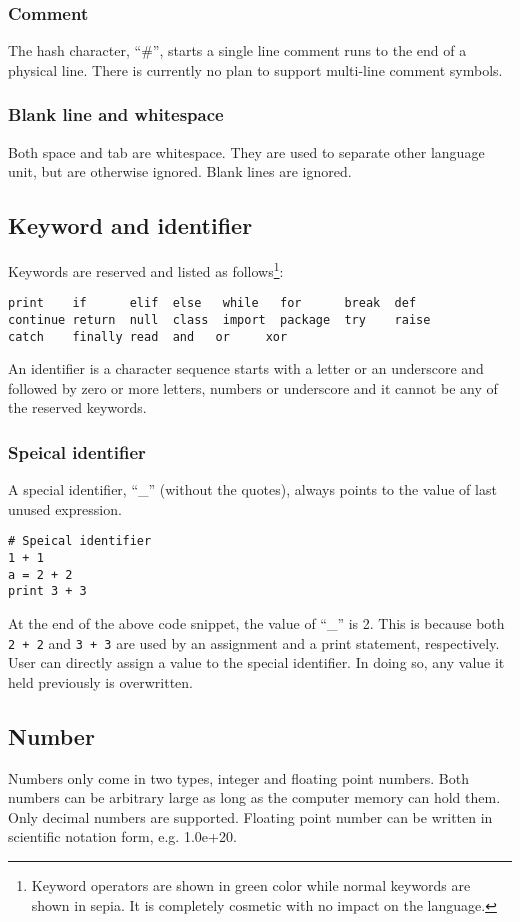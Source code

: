 \documentclass[10pt,a4paper]{article}
\begin{document}
\subsubsection{Comment}
The hash character, ``\#'', starts a single line comment runs to the end
of a physical line. There is currently no plan to support multi-line
comment symbols.

\subsubsection{Blank line and whitespace}
Both space and tab are whitespace. They are used to separate other 
language unit, but are otherwise ignored. Blank lines are ignored.

\subsection{Keyword and identifier}
Keywords are reserved and listed as follows\footnote{Keyword operators 
are shown in green color while normal keywords are shown in sepia. It is 
completely cosmetic with no impact on the language.}:
\begin{lstlisting}
print    if      elif  else   while   for      break  def   
continue return  null  class  import  package  try    raise
catch    finally read  and   or     xor 
\end{lstlisting}

An identifier is a character sequence starts with a letter or an underscore 
and followed by zero or more letters, numbers or underscore and it cannot
be any of the reserved keywords.

\subsubsection{Speical identifier}
A special identifier, ``_'' (without the quotes), always points
to the value of last unused expression.
\begin{lstlisting}
# Speical identifier
1 + 1
a = 2 + 2
print 3 + 3
\end{lstlisting}
At the end of the above code snippet, the value of ``_'' is 2. This is because 
both \lstinline$2 + 2$ and \lstinline$3 + 3$ are used by an assignment and
a print statement, respectively. User can directly assign a value to the special
identifier. In doing so, any value it held previously is overwritten.

\subsection{Number}
Numbers only come in two types, integer and floating point numbers.
Both numbers can be arbitrary large as long as the computer memory
can hold them. Only decimal numbers are supported. Floating point
number can be written in scientific notation form, e.g. 1.0e+20.
\end{document}
